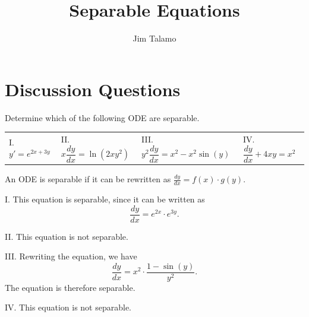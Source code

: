\documentclass[noauthor,handout]{ximera}
\author{Jim Talamo}
\title{Separable Equations}
\begin{document}
\begin{abstract}
\end{abstract}
\maketitle

\vspace{-0.9in}

\section{Discussion Questions}

\begin{problem} 

Determine which of the following ODE are separable.

\begin{tabular}{llll}

I. $y'=e^{2x+3y}$ \qquad & II. $x \dfrac{dy}{dx} =\ln(2xy^2)$ \qquad & III. $y^2 \dfrac{dy}{dx} = x^2-x^2\sin(y)$ \qquad & IV. $\dfrac{dy}{dx} +4xy =x^2$ 
\end{tabular}

\begin{freeResponse}
An ODE is separable if it can be rewritten as $\frac{dy}{dx} = f(x) \cdot g(y)$. 

I. This equation is separable, since it can be written as 
$$
\frac{dy}{dx} = e^{2x} \cdot e^{3y}.
$$

II. This equation is not separable.

III. Rewriting the equation, we have 
$$
\frac{dy}{dx} = x^2 \cdot \frac{1-\sin(y)}{y^2}.
$$
The equation is therefore separable.

IV. This equation is not separable.
\end{freeResponse}
\end{problem}


\end{document}
